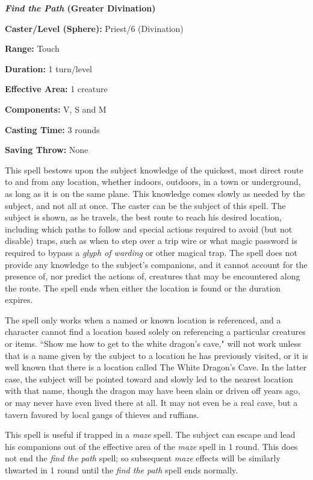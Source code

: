 \begin{multicols}{2}
\begin{minipage}{\columnwidth}
\noindent \textbf{\textit{Find the Path} (Greater Divination)}

\noindent \textbf{Caster/Level (Sphere):} Priest/6 (Divination)

\noindent \textbf{Range:} Touch

\noindent \textbf{Duration:} 1 turn/level

\noindent \textbf{Effective Area:} 1 creature

\noindent \textbf{Components:} V, S and M

\noindent \textbf{Casting Time:} 3 rounds

\noindent \textbf{Saving Throw:} None

\end{minipage}

This spell bestows upon the subject knowledge of the quickest, most direct route to and from any location, whether indoors, outdoors, in a town or underground, as long as it is on the same plane.  This knowledge comes slowly as needed by the subject, and not all at once.  The caster can be the subject of this spell.  The subject is shown, as he travels, the best route to reach his desired location, including which paths to follow and special actions required to avoid (but not disable) traps, such as when to step over a trip wire or what magic password is required to bypass a \textit{glyph of warding} or other magical trap.  The spell does not provide any knowledge to the subject's companions, and it cannot account for the presence of, nor predict the actions of, creatures that may be encountered along the route.  The spell ends when either the location is found or the duration expires.

The spell only works when a named or known location is referenced, and a character cannot find a location based solely on referencing a particular creatures or items.  ``Show me how to get to the white dragon's cave," will not work unless that is a name given by the subject to a location he has previously visited, or it is well known that there is a location called The White Dragon's Cave.  In the latter case, the subject will be pointed toward and slowly led to the nearest location with that name, though the dragon may have been slain or driven off years ago, or may never have even lived there at all.  It may not even be a real cave, but a tavern favored by local gangs of thieves and ruffians.

This spell is useful if trapped in a \textit{maze} spell.  The subject can escape and lead his companions out of the effective area of the \textit{maze} spell in 1 round.  This does not end the \textit{find the path} spell; so subsequent \textit{maze} effects will be similarly thwarted in 1 round until the \textit{find the path} spell ends normally.


\end{multicols}
